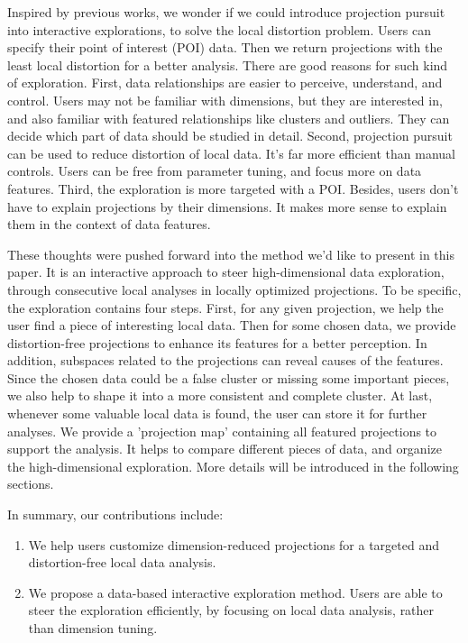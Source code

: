 {Inspired by previous works, we wonder if we could introduce projection pursuit into interactive explorations, to solve the local distortion problem. Users can specify their point of interest (POI) data. Then we return projections with the least local distortion for a better analysis. There are good reasons for such kind of exploration. First, data relationships are easier to perceive, understand, and control. Users may not be familiar with dimensions, but they are interested in, and also familiar with featured relationships like clusters and outliers. They can decide which part of data should be studied in detail. Second, projection pursuit can be used to reduce distortion of local data. It's far more efficient than manual controls. Users can be free from parameter tuning, and focus more on data features. Third, the exploration is more targeted with a POI. Besides, users don't have to explain projections by their dimensions. It makes more sense to explain them in the context of data features.

These thoughts were pushed forward into the method we'd like to present in this paper. It is an interactive approach to steer high-dimensional data exploration, through consecutive local analyses in locally optimized projections. To be specific, the exploration contains four steps. First, for any given projection, we help the user find a piece of interesting local data. Then for some chosen data, we provide distortion-free projections to enhance its features for a better perception. In addition, subspaces related to the projections can reveal causes of the features. Since the chosen data could be a false cluster or missing some important pieces, we also help to shape it into a more consistent and complete cluster. At last, whenever some valuable local data is found, the user can store it for further analyses. We provide a 'projection map' containing all featured projections to support the analysis. It helps to compare different pieces of data, and organize the high-dimensional exploration. More details will be introduced in the following sections.

In summary, our contributions include:
\begin{enumerate}[(1)]
\item We help users customize dimension-reduced projections for a targeted and distortion-free local data analysis.
\item We propose a data-based interactive exploration method. Users are able to steer the exploration efficiently, by focusing on local data analysis, rather than dimension tuning.
\end{enumerate}

}

